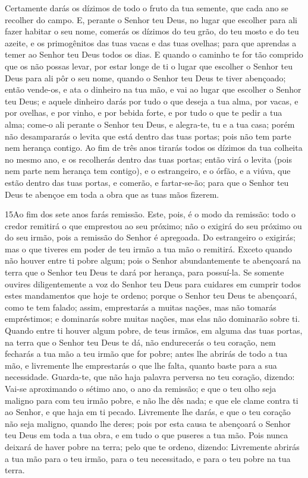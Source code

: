 Certamente darás os dízimos de todo o fruto da tua semente, que
cada ano se recolher do campo. E, perante o Senhor teu Deus,
no lugar que escolher para ali fazer habitar o seu nome, comerás os
dízimos do teu grão, do teu mosto e do teu azeite, e os primogênitos
das tuas vacas e das tuas ovelhas; para que aprendas a temer ao
Senhor teu Deus todos os dias. E quando o caminho te for tão
comprido que os não possas levar, por estar longe de ti o lugar que
escolher o Senhor teu Deus para ali pôr o seu nome, quando o Senhor
teu Deus te tiver abençoado; então vende-os, e ata o dinheiro
na tua mão, e vai ao lugar que escolher o Senhor teu Deus; e
aquele dinheiro darás por tudo o que deseja a tua alma, por vacas, e
por ovelhas, e por vinho, e por bebida forte, e por tudo o que te
pedir a tua alma; come-o ali perante o Senhor teu Deus, e alegra-te,
tu e a tua casa; porém não desampararás o levita que está
dentro das tuas portas; pois não tem parte nem herança contigo.
Ao fim de três anos tirarás todos os dízimos da tua colheita
no mesmo ano, e os recolherás dentro das tuas portas; então
virá o levita (pois nem parte nem herança tem contigo), e o
estrangeiro, e o órfão, e a viúva, que estão dentro das tuas portas,
e comerão, e fartar-se-ão; para que o Senhor teu Deus te abençoe em
toda a obra que as tuas mãos fizerem.

\medskip

\lettrine{15} Ao fim dos sete anos farás remissão. Este,
pois, é o modo da remissão: todo o credor remitirá o que emprestou
ao seu próximo; não o exigirá do seu próximo ou do seu irmão, pois a
remissão do Senhor é apregoada. Do estrangeiro o exigirás; mas o
que tiveres em poder de teu irmão a tua mão o remitirá. Exceto
quando não houver entre ti pobre algum; pois o Senhor abundantemente
te abençoará na terra que o Senhor teu Deus te dará por herança,
para possuí-la. Se somente ouvires diligentemente a voz do
Senhor teu Deus para cuidares em cumprir todos estes mandamentos que
hoje te ordeno; porque o Senhor teu Deus te abençoará, como te
tem falado; assim, emprestarás a muitas nações, mas não tomarás
empréstimos; e dominarás sobre muitas nações, mas elas não dominarão
sobre ti. Quando entre ti houver algum pobre, de teus irmãos, em
alguma das tuas portas, na terra que o Senhor teu Deus te dá, não
endurecerás o teu coração, nem fecharás a tua mão a teu irmão que
for pobre; antes lhe abrirás de todo a tua mão, e livremente lhe
emprestarás o que lhe falta, quanto baste para a sua necessidade.
Guarda-te, que não haja palavra perversa no teu coração,
dizendo: Vai-se aproximando o sétimo ano, o ano da remissão; e que o
teu olho seja maligno para com teu irmão pobre, e não lhe dês nada;
e que ele clame contra ti ao Senhor, e que haja em ti pecado.
Livremente lhe darás, e que o teu coração não seja maligno,
quando lhe deres; pois por esta causa te abençoará o Senhor teu Deus
em toda a tua obra, e em tudo o que puseres a tua mão. Pois
nunca deixará de haver pobre na terra; pelo que te ordeno, dizendo:
Livremente abrirás a tua mão para o teu irmão, para o teu
necessitado, e para o teu pobre na tua terra.

